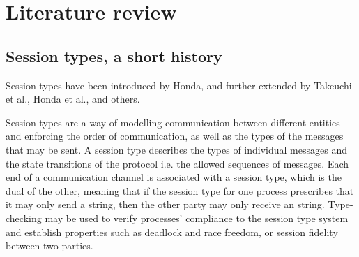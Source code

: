 \section{Literature review}
%
%
%
%


\subsection{Session types, a short history}
\label{sub: st}


Session types have been introduced by Honda\cite{honda93}, and further extended by Takeuchi et al.\cite{tk94}, Honda et al.\cite{honda98}, and others. 



Session types are a way of modelling communication between different entities and enforcing the order of communication, as well as the types of the messages that may be sent. A session type describes the types of individual messages and the state transitions of the protocol i.e. the allowed sequences of messages. Each end of a communication channel is associated with a session type, which is the dual of the other, meaning that if the session type for one process prescribes that it may only send a string, then the other party may only receive an string. Type-checking may be used to verify processes’ compliance to the session type system and establish properties such as deadlock and race freedom, or session fidelity between two parties.



